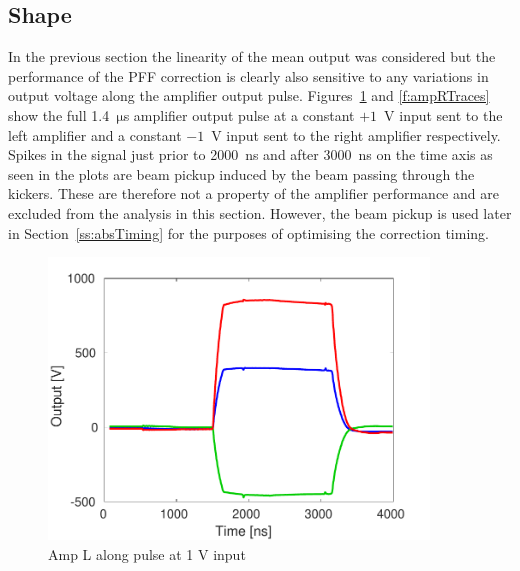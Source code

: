 \subsection{Shape}
\label{ss:ampShape}

In the previous section the linearity of the mean output was considered but the performance of the PFF correction is clearly also sensitive to any variations in output voltage along the amplifier output pulse. Figures~\ref{f:ampLTraces} and \ref{f:ampRTraces} show the full 1.4~\(\mathrm{\mu}\)s amplifier output pulse at a constant \(+1\)~V input sent to the left amplifier and a constant \(-1\)~V input sent to the right amplifier respectively. Spikes in the signal just prior to 2000~ns and after 3000~ns on the time axis as seen in the plots are beam pickup induced by the beam passing through the kickers. These are therefore not a property of the amplifier performance and are excluded from the analysis in this section. However, the beam pickup is used later in Section~\ref{ss:absTiming} for the purposes of optimising the correction timing.

\begin{figure}
  \centering
  \includegraphics[width=0.9\textwidth]{Figures/commissioning/AmpL_Traces}
  \caption{Amp L along pulse at 1 V input}
  \label{f:ampLTraces}
\end{figure}

